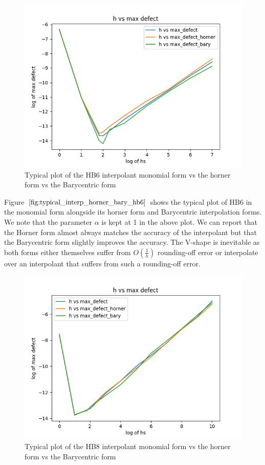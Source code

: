 \documentclass{article}
\begin{document}
\begin{figure}[H]
\centering
\includegraphics[width=0.7\linewidth]{./figures/typical_interp_horner_bary_hb6}
\caption{Typical plot of the HB6 interpolant monomial form vs the horner form vs the Barycentric form}
\label{fig:typical_interp_horner_bary_hb6}
\end{figure}

Figure $\ref{fig:typical_interp_horner_bary_hb6}$ shows the typical plot of HB6 in the monomial form alongside its horner form and Barycentric interpolation forms. We note that the parameter $\alpha$ is kept at 1 in the above plot. We can report that the Horner form almost always matches the accuracy of the interpolant but that the Barycentric form slightly improves the accuracy. The V-shape is inevitable as both forms either themselves suffer from $O(\frac{1}{h})$ rounding-off error or interpolate over an interpolant that suffers from such a rounding-off error.

\begin{figure}[H]
\centering
\includegraphics[width=0.7\linewidth]{./figures/typical_interp_horner_bary_hb8}
\caption{Typical plot of the HB8 interpolant monomial form vs the horner form vs the Barycentric form}
\label{fig:typical_interp_horner_bary_hb8}
\end{figure}
\end{document}
